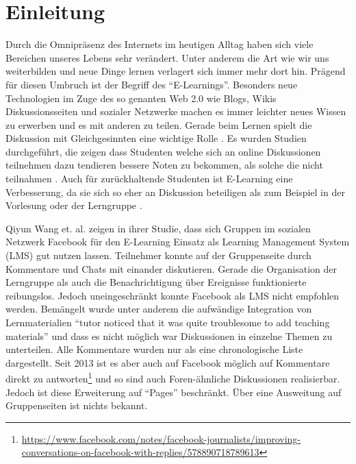 
\chapter{Einleitung} %
\label{cha:einleitung}





Durch die Omnipräsenz des Internets im heutigen Alltag haben sich viele Bereichen unseres Lebens sehr verändert. Unter anderem die Art wie wir uns weiterbilden und neue Dinge lernen verlagert sich immer mehr dort hin. Prägend für diesen Umbruch ist der Begriff des \enquote{E-Learnings}. Besonders neue Technologien im Zuge des so genanten Web 2.0 wie Blogs, Wikis Diskussionsseiten und sozialer Netzwerke machen es immer leichter neues Wissen zu erwerben und es mit anderen zu teilen. Gerade beim Lernen spielt die Diskussion mit Gleichgesinnten eine wichtige Rolle \cite{Downes2005}. Es wurden Studien durchgeführt, die zeigen dass Studenten welche sich an online Diskussionen teilnehmen dazu tendieren bessere Noten zu bekommen, als solche die nicht teilnahmen \cite{Davies2005,BJET:BJET780}. Auch für zurückhaltende Studenten ist E-Learning eine Verbesserung, da sie sich so eher an Diskussion beteiligen als zum Beispiel in der Vorlesung oder der Lerngruppe \cite{Huang:2009:EPF:1516241.1516267}. 

Qiyun Wang et. al. \cite{Wang2012} zeigen in ihrer Studie, dass sich Gruppen im sozialen Netzwerk Facebook für den E-Learning Einsatz als Learning Management System (LMS) gut nutzen lassen. Teilnehmer konnte auf der Gruppenseite durch Kommentare und Chats mit einander diskutieren. Gerade die Organisation der Lerngruppe als auch die Benachrichtigung über Ereignisse funktionierte reibungslos. Jedoch uneingeschränkt konnte Facebook als LMS nicht empfohlen werden. Bemängelt wurde unter anderem die aufwändige Integration von Lernmaterialien \enquote{tutor noticed that it was quite troublesome to add teaching materials}\cite[S.\,435]{Wang2012} und dass es nicht möglich war Diskussionen in einzelne Themen zu unterteilen. Alle Kommentare wurden nur als eine chronologische Liste dargestellt. Seit 2013 ist es aber auch auf Facebook möglich auf Kommentare direkt zu antworten\footnote{\url{https://www.facebook.com/notes/facebook-journalists/improving-conversations-on-facebook-with-replies/578890718789613}} und so sind auch Foren-ähnliche Diskussionen realisierbar. Jedoch ist diese Erweiterung auf \enquote{Pages} beschränkt. Über eine Ausweitung auf Gruppenseiten ist nichts bekannt. 

